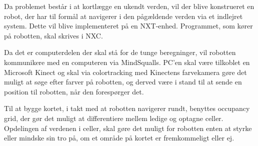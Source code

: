 Da problemet består i at kortlægge en ukendt verden, vil der blive konstrueret en robot, der har til formål at navigerer i den pågældende verden via et indlejret system.
Dette vil blive implementeret på en NXT-enhed.
Programmet, som kører på robotten, skal skrives i NXC.

Da det er computerdelen der skal stå for de tunge beregninger, vil robotten kommunikere med en computeren via MindSqualls.
PC'en skal være tilkoblet en Microsoft Kinect og skal via colortracking med Kinectens farvekamera gøre det muligt at søge efter farver på robotten, og derved være i stand til at sende en position til robotten, når den forespørger det.

Til at bygge kortet, i takt med at robotten navigerer rundt, benyttes occupancy grid, der gør det muligt at differentiere mellem ledige og optagne celler.
Opdelingen af verdenen i celler, skal gøre det muligt for robotten enten at styrke eller mindske sin tro på, om et område på kortet er fremkommeligt eller ej.
